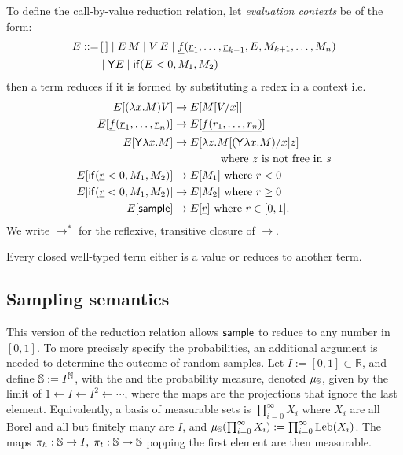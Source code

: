 To define the call-by-value reduction relation, let \emph{evaluation contexts} be of the form:
\begin{align*}
  E ::= & \, [\,] \mid E \, M \mid V \, E \mid \underline{f}(\underline r_1,\dots ,\underline r_{k-1}, E, M_{k+1}, \dots, M_n) \\ & \mid \mathsf{Y} E \mid \mathsf{if}(E<0, M_1, M_2)
\end{align*}
then a term reduces if it is formed by substituting a redex in a context i.e.
\begin{align*}
  E[(\lambda x.M) V] & \to E[M[V/x]] \\
  E[\underline f (\underline r_1, \dots , \underline r_n)] & \to E[\underline{f(r_1,\dots,r_n)}] \\
  E[\mathsf{Y} \lambda x. M] & \to E[\lambda z. M[(\mathsf{Y} \lambda x. M)/x] z] \\
  & \qquad \qquad \text{ where $z$ is not free in $s$}\\
  E[\mathsf{if}(\underline r < 0, M_1, M_2)] & \to E[M_1] \text{ where }r < 0 \\
  E[\mathsf{if}(\underline r < 0, M_1, M_2)] & \to E[M_2] \text{ where }r \geq 0 \\
  E[\mathsf{sample}] & \to E[\underline r] \text{ where } r \in [0,1].
\end{align*}
We write $\to^\ast$ for the reflexive, transitive closure of $\to$.

Every closed well-typed term either is a value or reduces to another term.

\subsection{Sampling semantics}
\label{sec:sampling semantics}
This version of the reduction relation allows $\mathsf{sample}$ to reduce to any number in $[0,1]$. 
To more precisely specify the probabilities, an additional argument is needed to determine the outcome of random samples. Let $ I := [0,1] \subset \mathbb{R} $, and define ${\mathbb{S}} := I^{\mathbb{N}}$, with the  and the probability measure, denoted $\mu_{{\mathbb{S}}}$, given by the limit of $1 \gets I \gets I^2 \gets \cdots$, where the maps are the projections that ignore the last element. Equivalently, a basis of measurable sets is $\prod_{i=0}^\infty X_i$ where $X_i$ are all Borel and all but finitely many are $I$, and $\mu_{{\mathbb{S}}} (\prod_{i=0}^\infty X_i) := \prod_{i=0}^\infty \mathrm{Leb}(X_i)$.
The maps $\pi_h:{\mathbb{S}} \to I, \; \pi_t:{\mathbb{S}} \to {\mathbb{S}}$ popping the first element are then measurable.

